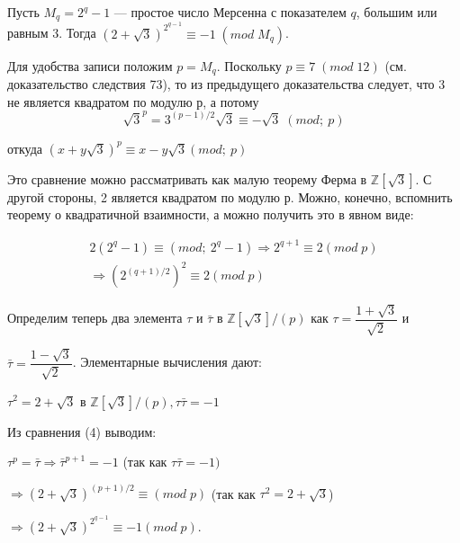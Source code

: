 \documentclass{mai_book}
\begin{document}
 	 \begin{sled}
 	 \noindent
 	 
 	 Пусть $M_q = 2^q - 1$ — простое число Мерсенна с показателем $q$, большим или равным 3. Тогда $(2+\sqrt{3})^{2^{q-1}} \equiv -1 \; (mod\;M_q)$.
 	 \end{sled}
 	 \begin{myproof}
 	 \noindent
 	 
 	 
 	 	
 	 	Для удобства записи положим $p = M_q$. Поскольку $p \equiv 7 \; (mod\;12)$ (см. доказательство следствия 73), то из предыдущего доказательства следует, что 3 не является квадратом по модулю $р$, а потому 
 	 	\begin{equation}
 	 	\sqrt{3}^p = 3^{(p-1)/2}\sqrt{3}\equiv -\sqrt{3} \;(mod;\ p)
 	 	\end{equation}
 	 	
 	 	\begin{center}
 	 		откуда $(x+y\sqrt{3})^p \equiv x- y\sqrt{3} (mod;\ p)$
 	 	\end{center}
  	    Это сравнение можно рассматривать как малую теорему Ферма в $\mathbb Z[\sqrt{3}]$. С другой стороны, 2 является квадратом по модулю $р$. Можно, конечно, вспомнить теорему о квадратичной взаимности, а можно получить это в явном виде:

 	 	\begin{equation}
 	 		\begin{split}
 	 			2(2^q-1) \equiv (mod ;\ 2^q-1)  \Rightarrow 2^{q+1} \equiv 2 (mod \; p) \\ 	
 	 			 \Rightarrow (2^{(q+1)/2})^2 \equiv 2 (mod \; p)
 	 		\end{split}
 	 	\end{equation}

 	 	Определим теперь два элемента $\tau$ и $\bar{\tau}$ в $\mathbb Z[\sqrt{3}]/(p)$ как $\tau = \dfrac{1+\sqrt{3}}{\sqrt{2}}$ и
 	 
 	 
 	 \pagebreak 
  	 
  	 
  	 	$\bar\tau = \dfrac{1-\sqrt{3}}{\sqrt{2}}$. Элементарные вычисления дают:
		\begin{center}
			$\tau^2 = 2 +\sqrt{3}$ в $\mathbb Z[\sqrt{3}]/(p), \tau\bar{\tau}=-1$
		\end{center}
		
		Из сравнения (4) выводим:
		
		$\tau^p=\bar{\tau}\Rightarrow\bar{\tau}^{p+1}=-1$ (так как $\tau\bar{\tau}=-1)$ \begin{center}
			$\Rightarrow (2+\sqrt{3})^{(p+1)/2} \equiv (mod\;p)$ (так как $\tau^2 = 2+\sqrt{3}$)
		\end{center} 
		\begin{center}
		$\Rightarrow (2+\sqrt{3})^{2^{q-1}} \equiv -1 (mod\;p)$.
		\end{center} 

  	 \end{myproof}	
   
\end{document}
